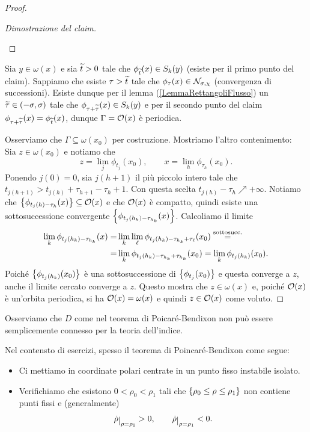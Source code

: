 \begin{proof}
\begin{proof}[Dimostrazione del claim]
\begin{itemize}
\end{itemize}
\setlength{\leftmargini}{0.5cm}
\end{proof}
\noindent
Sia $y\in \omega(x)$ e sia $\wt t>0$ tale che $\phi_{\wt t}(x)\in S_k(y)$ (esiste per il primo punto del claim). Sappiamo che esiste $\tau>\wt t$ tale che $\phi_{\tau}(x)\in \Nc_{\sigma,\chi}$ (convergenza di successioni). Esiste dunque per il lemma (\ref{LemmaRettangoliFlusso}) un $\wt \tau\in (-\sigma,\sigma)$ tale che $\phi_{\tau+\wt \tau}(x)\in S_k(y)$ e per il secondo punto del claim $\phi_{\tau+\wt\tau}(x)=\phi_{\wt t}(x)$, dunque $\Gamma=\Oc(x)$ \`e periodica.
\vspace{0.25cm}

\noindent
Osserviamo che $\Gamma\subseteq \omega(x_0)$ per costruzione. Mostriamo l'altro contenimento:\\
Sia $z\in \omega(x_0)$ e notiamo che 
\[z=\lim_j \phi_{t_j}(x_0),\qquad x=\lim_{h}\phi_{\tau_h}(x_0).\] 
Ponendo $j(0)=0$, sia $j(h+1)$ il pi\`u piccolo intero tale che $t_{j(h+1)}>t_{j(h)}+\tau_{h+1}-\tau_{h}+1$. Con questa scelta $t_{j(h)}-\tau_h\nearrow +\infty$. Notiamo che $\cpa{\phi_{t_j(h)-\tau_h}(x)}\subseteq \Oc(x)$ e che $\Oc(x)$ \`e compatto, quindi esiste una sottosuccessione convergente $\cpa{\phi_{t_j(h_k)-\tau_{h_k}}(x)}$. Calcoliamo il limite
\begin{align*}
\lim_k\phi_{t_j(h_k)-\tau_{h_k}}(x)=&\lim_k\lim_\ell\phi_{t_j(h_k)-\tau_{h_k}+\tau_\ell}(x_0)\pasgnl={sottosucc.}\\
=&\lim_k\phi_{t_j(h_k)-\tau_{h_k}+\tau_{h_k}}(x_0)=\lim_k\phi_{t_j(h_k)}(x_0).
\end{align*}
Poich\'e $\cpa{\phi_{t_j(h_k)}(x_0)}$ \`e una sottosuccessione di $\cpa{\phi_{t_j}(x_0)}$ e questa converge a $z$, anche il limite cercato converge a $z$. Questo mostra che $z\in \omega(x)$ e,
poich\'e $\Oc(x)$ \`e un'orbita periodica, si ha $\Oc(x)=\omega(x)$ e quindi $z\in \Oc(x)$ come voluto.
\end{proof}

\begin{remark}
Osserviamo che $D$ come nel teorema di Poicar\'e-Bendixon non pu\`o essere semplicemente connesso per la teoria dell'indice.
\end{remark}

\begin{remark}
Nel contensto di esercizi, spesso il teorema di Poincar\'e-Bendixon come segue:
\begin{itemize}
\item Ci mettiamo in coordinate polari centrate in un punto fisso instabile isolato.
\item Verifichiamo che esistono $0<\rho_0<\rho_1$ tali che $\cpa{\rho_0\leq\rho\leq \rho_1}$ non contiene punti fissi e (generalmente) 
\[\dot\rho\res{\rho=\rho_0}>0,\qquad\dot \rho\res{\rho=\rho_1}<0.\]
\end{itemize}
\end{remark}

